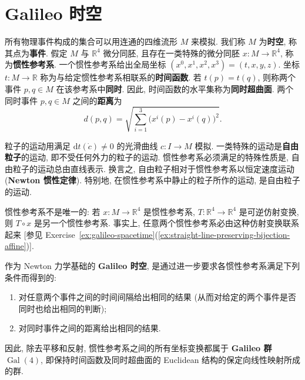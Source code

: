 \section{Galileo 时空}\label{sec:galileo-spacetime}

所有物理事件构成的集合可以用连通的四维流形 $M$ 来模拟. 我们称 $M$ 为\textbf{时空}, 称其点为\textbf{事件}. 假定 $M$ 与 $\mathbb{R}^4$ 微分同胚, 且存在一类特殊的微分同胚 $x:M\to\mathbb{R}^4$, 称为\textbf{惯性参考系}. 一个惯性参考系给出全局坐标 $(x^0,x^1,x^2,x^3)=(t,x,y,z)$. 坐标 $t:M\to\mathbb{R}$ 称为与给定惯性参考系相联系的\textbf{时间函数}. 若 $t(p)=t(q)$, 则称两个事件 $p,q\in M$ 在该参考系中\textbf{同时}. 因此, 时间函数的水平集称为\textbf{同时超曲面}. 两个同时事件 $p,q\in M$ 之间的\textbf{距离}为
\[
  d(p,q)=\sqrt{\sum_{i=1}^3\bigl(x^i(p)-x^i(q)\bigr)^2}.
\]

粒子的运动用满足 $\mathrm{d}t(\dot c)\ne0$ 的光滑曲线 $c:I\to M$ 模拟. 一类特殊的运动是\textbf{自由粒子}的运动, 即不受任何外力的粒子的运动. 惯性参考系必须满足的特殊性质是, 自由粒子的运动总由直线表示. 换言之, 自由粒子相对于惯性参考系以恒定速度运动 (\textbf{Newton 惯性定律}). 特别地, 在惯性参考系中静止的粒子所作的运动, 是自由粒子的运动.

惯性参考系不是唯一的: 若 $x:M\to\mathbb{R}^4$ 是惯性参考系, $T:\mathbb{R}^4\to\mathbb{R}^4$ 是可逆仿射变换, 则 $T\circ x$ 是另一个惯性参考系. 事实上, 任意两个惯性参考系必由这种仿射变换联系起来 [参见 Exercise~\ref{ex:galileo-spacetime}(\ref{ex:straight-line-preserving-bijection-affine})].

作为 Newton 力学基础的 \textbf{Galileo 时空}, 是通过进一步要求各惯性参考系满足下列条件而得到的:
\begin{enumerate}[label=(\arabic*),leftmargin=*]
\item 对任意两个事件之间的时间间隔给出相同的结果 (从而对给定的两个事件是否同时也给出相同的判断);
\item 对同时事件之间的距离给出相同的结果.
\end{enumerate}

因此, 除去平移和反射, 惯性参考系之间的所有坐标变换都属于 \textbf{Galileo 群} $\operatorname{Gal}(4)$, 即保持时间函数及同时超曲面的 Euclidean 结构的保定向线性映射所成的群.


